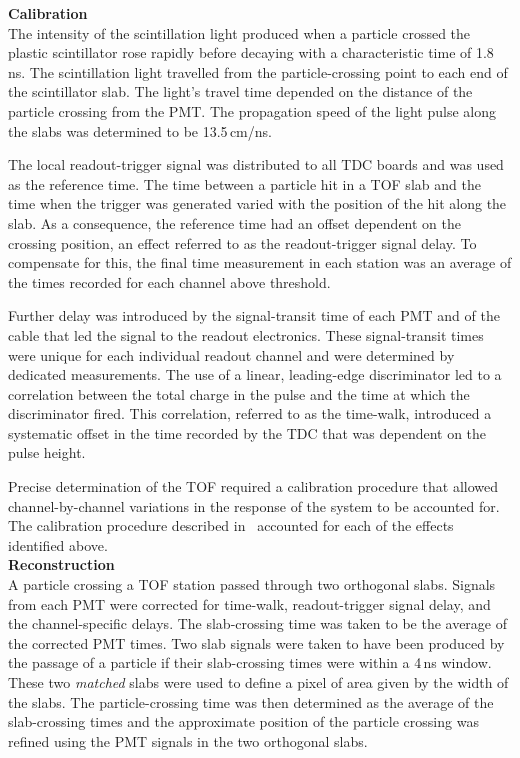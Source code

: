 \noindent\textbf{Calibration} \\
\noindent
The intensity of the scintillation light produced when a particle
crossed the plastic scintillator rose rapidly before decaying
with a characteristic time of 1.8\,ns. 
The scintillation light travelled from the particle-crossing point to
each end of the scintillator slab.
The light's travel time depended on the distance of the particle crossing from the PMT.
The propagation speed of the light pulse along the slabs was determined to be 13.5\,cm/ns.

The local readout-trigger signal was distributed to all TDC boards and was
used as the reference time.
The time between a particle hit in a TOF slab and the time when the
trigger was generated varied with the position of the hit along the slab.
As a consequence, the reference time had an offset dependent on
the crossing position, an effect referred to as the
readout-trigger signal delay.
To compensate for this, the final time measurement in each station was
an average of the times recorded for each channel above
threshold.

Further delay was introduced by the signal-transit time of each PMT
and of the cable that led the signal to the readout electronics.
These signal-transit times were unique for each individual readout
channel and were determined by dedicated measurements.
The use of a linear, leading-edge discriminator led to a correlation
between the total charge in the pulse and the time at which the
discriminator fired.
This correlation, referred to as the time-walk, introduced a
systematic offset in the time recorded by the TDC that was dependent on the pulse
height. 

Precise determination of the TOF required a calibration procedure that
allowed channel-by-channel variations in the response of the system to
be accounted for.
The calibration procedure described in~\cite{NOTE251} accounted for
each of the effects identified above. \\

\noindent\textbf{Reconstruction} \\
\noindent
A particle crossing a TOF station passed through two orthogonal
slabs.
Signals from each PMT were corrected for time-walk, readout-trigger
signal delay, and the channel-specific delays.
The slab-crossing time was taken to be the average of the corrected
PMT times.
Two slab signals were taken to have been produced by the passage of a
particle if their slab-crossing times were within a 4\,ns window.
These two \textit{matched} slabs were used to define a pixel of area given by the
width of the slabs.
The particle-crossing time was then determined as the average of the
slab-crossing times and the approximate position of the particle crossing was
refined using the PMT signals in the two orthogonal slabs. \\

